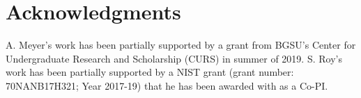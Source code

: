\documentclass{mcurcsm}
\begin{document}
%

\section{Acknowledgments} A. Meyer's work has been partially supported by a grant from BGSU's Center for Undergraduate Research and Scholarship 
(CURS) in summer of 2019. S. Roy's work has been partially supported by a NIST grant (grant number: 70NANB17H321; Year 2017-19) that he has been awarded with as a Co-PI. 

%

%


\end{document}
